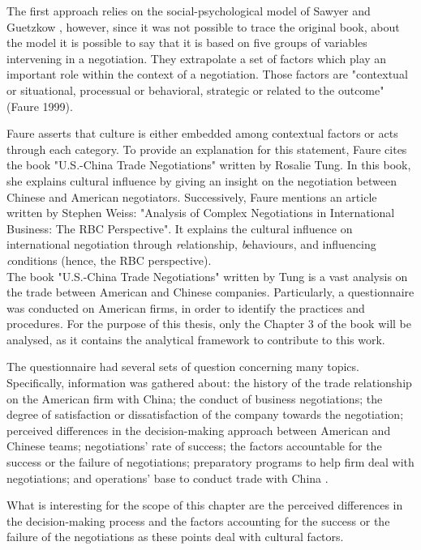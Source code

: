 \documentclass[../main.tex]{subfiles}
\begin{document}
The first approach relies on the social-psychological model of Sawyer and Guetzkow \cite{sawyer}, however, since it was not possible to trace the original book, about the model it is possible to say that it is based on five groups of variables intervening in a negotiation. They extrapolate a set of factors which play an important role within the context of a negotiation. Those factors are "contextual or situational, processual or behavioral, strategic or related to the outcome" (Faure 1999).

Faure asserts that culture is either embedded among contextual factors or acts through each category.
To provide an explanation for this statement, Faure cites the book "U.S.-China Trade Negotiations"\cite{tung} written by Rosalie Tung. In this book, she explains cultural influence by giving an insight on the negotiation between Chinese and American negotiators. Successively, Faure mentions an article written by Stephen Weiss: "Analysis of Complex Negotiations in International Business: The RBC Perspective"\cite{weiss}. It explains the cultural influence on international negotiation through \textit{r}elationship, \textit{b}ehaviours, and influencing \textit{c}onditions (hence, the RBC perspective).\\

The book "U.S.-China Trade Negotiations" written by Tung is a vast analysis on the trade between American and Chinese companies. Particularly, a questionnaire was conducted on American firms, in order to identify the practices and procedures. For the purpose of this thesis, only the Chapter 3 of the book will be analysed, as it contains the analytical framework to contribute to this work.

The questionnaire had several sets of question concerning many topics. Specifically, information was gathered about: the history of the trade relationship on the American firm with China; the conduct of business negotiations; the degree of satisfaction or dissatisfaction of the company towards the negotiation; perceived differences in the decision-making approach between American and Chinese teams; negotiations' rate of success; the factors accountable for the success or the failure of negotiations; preparatory programs to help firm deal with negotiations; and operations' base to conduct trade with China \autocite[56]{tung}.

What is interesting for the scope of this chapter are the perceived differences in the decision-making process and the factors accounting for the success or the failure of the negotiations as these points deal with cultural factors.
\end{document}

